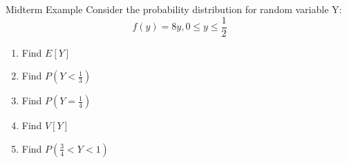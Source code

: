 \documentclass{beamer}
\begin{document}
\begin{frame}

	

\end{frame}

\begin{frame}{Midterm Example}
	Consider the probability distribution for random variable Y:
	$$f(y)= 8y, 0\leq y \leq \frac{1}{2}$$
	\begin{enumerate}[label=(\alph*)]
		\item Find $E[Y]$
		\item Find $P(Y<\frac{1}{3})$
		\item Find $P(Y=\frac{1}{4})$
		\item Find $V[Y]$
		\item Find $P(\frac{3}{4}<Y<1)$
	\end{enumerate}
\end{frame}

\begin{frame}

	

\end{frame}
\end{document}
